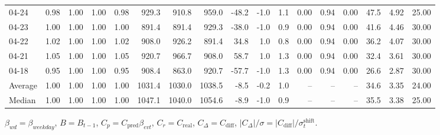 \begin{threeparttable}
{\begin{tabular}{lrrrrrrrrrrrrrrrr}
  04-24 &         0.98 &           1.00 &          1.00 &          0.98 &  929.3 &  910.8 &  959.0 &      -48.2 &                     -1.0 &                 1.1 &       0.00 &      0.94 &           0.00 &             47.5 &            4.92 &                  25.00 \\
  04-23 &         1.00 &           1.00 &          1.00 &          1.00 &  891.4 &  891.4 &  929.3 &      -38.0 &                     -1.0 &                 0.9 &       0.00 &      0.94 &           0.00 &             41.6 &            4.46 &                  30.00 \\
  04-22 &         1.02 &           1.00 &          1.00 &          1.02 &  908.0 &  926.2 &  891.4 &       34.8 &                      1.0 &                 0.8 &       0.00 &      0.94 &           0.00 &             36.2 &            4.07 &                  30.00 \\
  04-21 &         1.05 &           1.00 &          1.00 &          1.05 &  920.7 &  966.7 &  908.0 &       58.7 &                      1.0 &                 1.3 &       0.00 &      0.94 &           0.00 &             32.4 &            3.61 &                  30.00 \\
  04-18 &         0.95 &           1.00 &          1.00 &          0.95 &  908.4 &  863.0 &  920.7 &      -57.7 &                     -1.0 &                 1.3 &       0.00 &      0.94 &           0.00 &             26.6 &            2.87 &                  30.00 \\
Average &         1.00 &           1.00 &          1.00 &          1.00 & 1031.4 & 1030.0 & 1038.5 &       -8.5 &                     -0.2 &                 1.0 &         -- &        -- &             -- &             34.6 &            3.35 &                  24.00 \\
 Median &         1.00 &           1.00 &          1.00 &          1.00 & 1047.1 & 1040.0 & 1054.6 &       -8.9 &                     -1.0 &                 0.9 &         -- &        -- &             -- &             35.5 &            3.38 &                  25.00 \\
\bottomrule
\end{tabular}
}
\begin{tablenotes}\footnotesize
\item $\beta_{wd}=\beta_{weekday}$, $B=B_{t-1}$,
$C_p=C_{\text{pred}}\beta_{evt}$, $C_r=C_{\text{real}}$,
$C_\Delta=C_{\text{diff}}$, $|C_\Delta|/\sigma=|C_{\text{diff}}|/\sigma_t^{\text{shift}}$.
\end{tablenotes}
\end{threeparttable}
\endgroup
